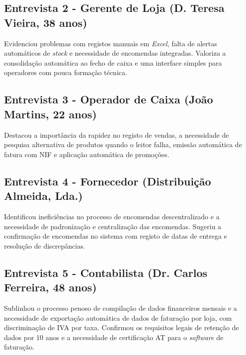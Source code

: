     \subsection{Entrevista 2 - Gerente de Loja (D. Teresa Vieira, 38 anos)}
    Evidenciou problemas com registos manuais em \textit{Excel}, falta de alertas automáticos de \textit{stock} e necessidade de encomendas integradas. Valoriza a consolidação automática ao fecho de caixa e uma interface simples para operadores com pouca formação técnica.

    \subsection{Entrevista 3 - Operador de Caixa (João Martins, 22 anos)}
    Destacou a importância da rapidez no registo de vendas, a necessidade de pesquisa alternativa de produtos quando o leitor falha, emissão automática de fatura com NIF e aplicação automática de promoções.

    \subsection{Entrevista 4 - Fornecedor (Distribuição Almeida, Lda.)}
    Identificou ineficiências no processo de encomendas descentralizado e a necessidade de padronização e centralização das encomendas. Sugeriu a confirmação de encomendas no sistema com registo de datas de entrega e resolução de discrepâncias.

    \subsection{Entrevista 5 - Contabilista (Dr. Carlos Ferreira, 48 anos)}
    Sublinhou o processo penoso de compilação de dados financeiros mensais e a necessidade de exportação automática de dados de faturação por loja, com discriminação de IVA por taxa. Confirmou os requisitos legais de retenção de dados por 10 anos e a necessidade de certificação AT para o \textit{software} de faturação.

